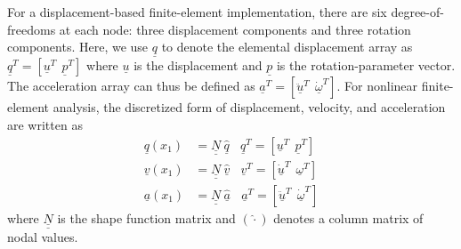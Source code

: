 \documentclass{aiaa-tc}
\newcommand{\tens}[1]{\underline{\underline{#1}}}
\renewcommand{\vec}[1]{\underline{#1}}
\begin{document}
For a displacement-based finite-element implementation, there are six
degree-of-freedoms at each node: three displacement components and three
rotation components. Here, we use $\vec{q}$ to denote the elemental
displacement array as $\underline{q}^T=\left[
\underline{u}^T~~\underline{p}^T\right]$ where $\vec{u}$ is the
displacement and $\vec{p}$ is the rotation-parameter vector. The
acceleration array can thus be defined as $\underline{a}^T=\left[
\ddot{\underline{u}}^T~~ \dot{\underline{\omega}}^T \right]$. For nonlinear
finite-element analysis, the discretized form of
displacement, velocity, and acceleration are written as
\begin{align}
	\label{DiscretizedDisp}
	\underline{q} (x_1) &= \underline{\underline{N}} ~\hat{\underline{q}}~~~~\underline{q}^T = \left[ \underline{u}^T~~\underline{p}^T \right] \\
	\label{DiscretizedVel}
	\underline{v}(x_1) &= \underline{\underline{N}}~\hat{\underline{v}}~~~~\underline{v}^T = \left[\underline{\dot{u}}^T~~\underline{\omega}^T \right] \\
	\label{DiscretizedAcc}
	\underline{a}(x_1) &= \underline{\underline{N}}~ \hat{\underline{a}}~~~~\underline{a}^T = \left[ \ddot{\underline{u}}^T~~\dot{\underline{\omega}}^T \right]	
\end{align}
where $\tens{N}$ is the shape function matrix and $(\hat{\cdot})$ denotes a
column matrix of nodal values.
\end{document}
